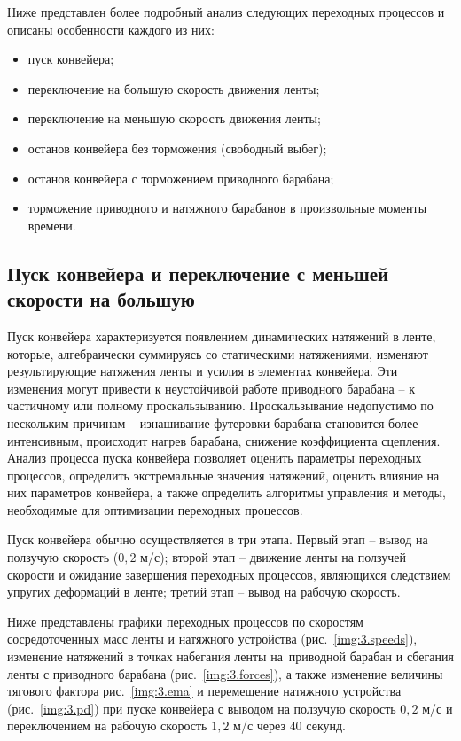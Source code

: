 Ниже представлен более подробный анализ следующих переходных процессов и описаны особенности каждого из них:
\begin{itemize}
\item пуск конвейера;
\item переключение на большую скорость движения ленты;
\item переключение на меньшую скорость движения ленты;
\item останов конвейера без торможения (свободный выбег);
\item останов конвейера с торможением приводного барабана;
\item торможение приводного и натяжного барабанов в произвольные моменты времени.
\end{itemize}

\subsection{Пуск конвейера и переключение с меньшей скорости на большую} \label{subsect3_5_1}
Пуск конвейера характеризуется появлением динамических натяжений в ленте, которые, алгебраически суммируясь со статическими натяжениями, изменяют результирующие натяжения ленты и усилия в элементах конвейера. Эти изменения могут привести к неустойчивой работе приводного барабана -- к частичному или полному проскальзыванию. Проскальзывание недопустимо по нескольким причинам -- изнашивание футеровки барабана становится более интенсивным, происходит нагрев барабана, снижение коэффициента сцепления. Анализ процесса пуска конвейера позволяет оценить параметры переходных процессов, определить экстремальные значения натяжений, оценить влияние на них параметров конвейера, а также определить алгоритмы управления и методы, необходимые для оптимизации переходных процессов.

Пуск конвейера обычно осуществляется в три этапа. Первый этап -- вывод на ползучую скорость ($0,2$ м/с); второй этап -- движение ленты на ползучей скорости и ожидание завершения переходных процессов, являющихся следствием упругих деформаций в ленте; третий этап -- вывод на рабочую скорость.

Ниже представлены графики переходных процессов по скоростям сосредоточенных масс ленты и натяжного устройства (рис.~\ref{img:3.speeds}), изменение натяжений в точках набегания ленты на~приводной барабан и сбегания ленты с приводного барабана (рис.~\ref{img:3.forces}), а также изменение величины тягового фактора рис.~\ref{img:3.ema} и перемещение натяжного устройства (рис.~\ref{img:3.pd}) при пуске конвейера с выводом на ползучую скорость $0,2$ м/с и переключением на рабочую скорость $1,2$ м/с через $40$ секунд.

